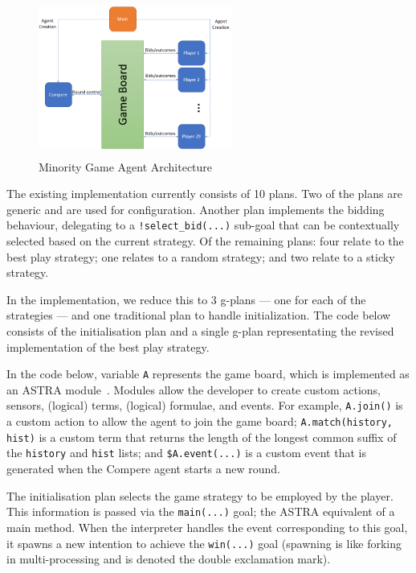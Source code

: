 \begin{figure}[!tbh]
\centering
\includegraphics[height=2in, width=2.5in]{mg.png}
\caption{Minority Game Agent Architecture}
\label{fig:mgagents}
\end{figure}

The existing implementation currently consists of 10 plans. Two of the plans are generic and are
used for configuration. Another plan implements the bidding behaviour, delegating to a 
\verb|!select_bid(...)| sub-goal that can be contextually selected based on the current strategy.
Of the remaining plans: four relate to the best play strategy; one relates to a random strategy;
and two relate to a sticky strategy.


In the {\aser} implementation, we reduce this to 3 g-plans --- one for each of the strategies --- 
and one traditional plan to handle initialization. The code below consists of the initialisation 
plan and a single g-plan representating the revised implementation of the best play strategy.

In the code below, variable \verb|A| represents the game board, which
is implemented as an ASTRA module~\cite{DBLP:conf/prima/CollierRL15}. Modules allow the developer to
create custom actions, sensors, (logical) terms, (logical) formulae,
and events. For example, \verb|A.join()| is a custom action to allow
the agent to join the game board; \verb|A.match(history, hist)| is a
custom term that returns the length of the longest common suffix of the
\verb|history| and \verb|hist| lists; and
\verb|$A.event(...)| is a custom event that is generated when the
Compere agent starts a new round.

The initialisation plan selects the game strategy to be employed by the player. This information
 is passed via the \verb|main(...)| goal; the ASTRA equivalent of a
 main method. When the interpreter handles
the event corresponding to this goal, it spawns a new intention to achieve the \verb|win(...)| 
goal (spawning is like forking in multi-processing and is denoted the double exclamation mark).

